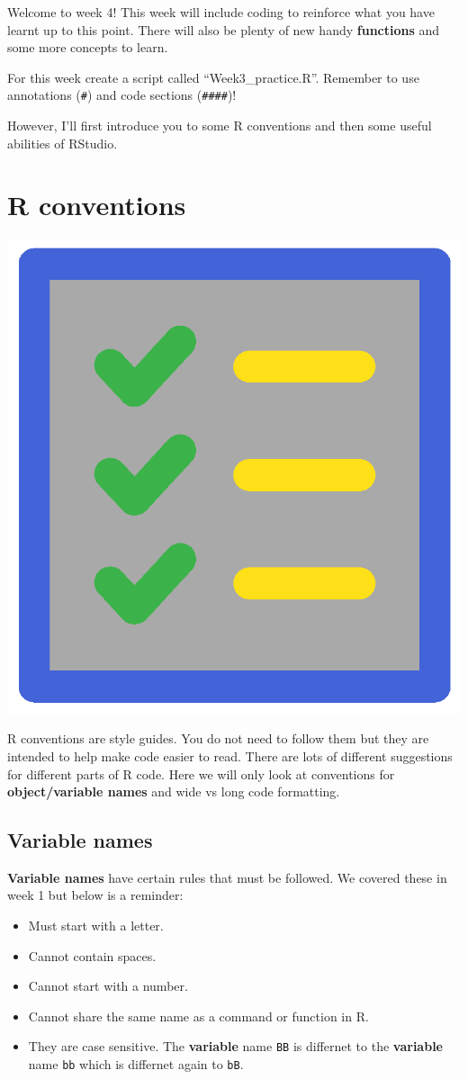 \documentclass[]{book}
\providecommand{\tightlist}{%
  \setlength{\itemsep}{0pt}\setlength{\parskip}{0pt}}
\begin{document}
Welcome to week 4! This week will include coding to reinforce what you
have learnt up to this point. There will also be plenty of new handy
\textbf{functions} and some more concepts to learn.

For this week create a script called ``Week3\_practice.R''. Remember to
use annotations (\texttt{\#}) and code sections (\texttt{\#\#\#\#})!

However, I'll first introduce you to some R conventions and then some
useful abilities of RStudio.

\section{R conventions}\label{r-conventions}

\begin{center}\includegraphics[width=0.2\linewidth]{figures/rules} \end{center}

R conventions are style guides. You do not need to follow them but they
are intended to help make code easier to read. There are lots of
different suggestions for different parts of R code. Here we will only
look at conventions for \textbf{object/variable names} and wide vs long
code formatting.

\subsection{Variable names}\label{variable-names}

\textbf{Variable names} have certain rules that must be followed. We
covered these in week 1 but below is a reminder:

\begin{itemize}
\tightlist
\item
  Must start with a letter.
\item
  Cannot contain spaces.
\item
  Cannot start with a number.
\item
  Cannot share the same name as a command or function in R.
\item
  They are case sensitive. The \textbf{variable} name \texttt{BB} is
  differnet to the \textbf{variable} name \texttt{bb} which is differnet
  again to \texttt{bB}.
\end{itemize}
\end{document}
